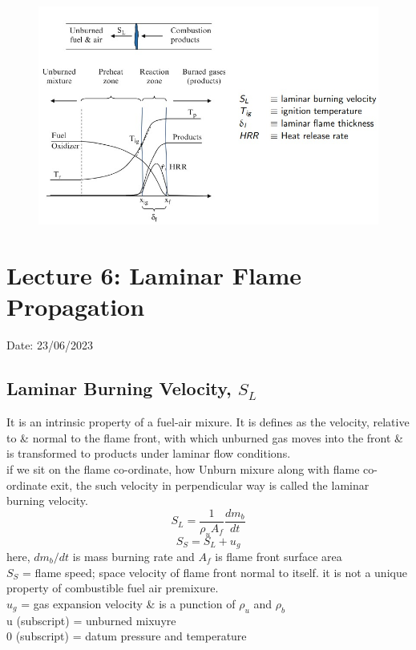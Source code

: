\documentclass{article}
\begin{document}
\begin{figure}[h]
  \begin{center}
    \includegraphics[width=0.95\linewidth]{img/flame_graph.jpeg}
  \end{center}
\end{figure}


\section{Lecture 6: Laminar Flame Propagation }
\hfill Date: 23/06/2023

\subsection*{Laminar Burning Velocity, $S_L$}
It is an intrinsic property of a fuel-air mixure. It is defines as the velocity, relative to \& normal to the flame front, with which unburned gas moves into the front \& is transformed to products under laminar flow conditions. \\
\textbullet if we sit on the flame co-ordinate, how Unburn mixure along with flame co-ordinate exit, the such velocity in perpendicular  way is called the laminar burning velocity.  
$$S_L = \frac{1}{\rho_u A_f} \frac{dm_b}{dt}$$
$$S_S = S_L + u_g$$ 
here, $dm_b/dt$ is mass burning rate and $A_f$ is flame front surface area \\
$S_S$ = flame speed; space velocity of flame front normal to itself. it is not a unique property of combustible fuel air premixure. \\
$u_g$ = gas expansion velocity \& is a punction of $\rho_u$ and $\rho_b$ \\
u (subscript) = unburned mixuyre \\
0 (subscript) = datum pressure and temperature \\
\end{document}
